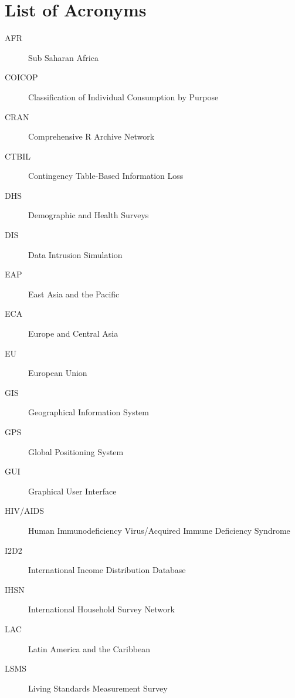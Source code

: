 \documentclass[letterpaper,10pt,english]{sphinxmanual}
\begin{document}
\section{List of Acronyms}
\label{\detokenize{glossary_acr:list-of-acronyms}}\begin{description}
\item[{AFR}] \leavevmode
Sub Saharan Africa

\item[{COICOP}] \leavevmode
Classification of Individual Consumption by Purpose

\item[{CRAN}] \leavevmode
Comprehensive R Archive Network

\item[{CTBIL}] \leavevmode
Contingency Table-Based Information Loss

\item[{DHS}] \leavevmode
Demographic and Health Surveys

\item[{DIS}] \leavevmode
Data Intrusion Simulation

\item[{EAP}] \leavevmode
East Asia and the Pacific

\item[{ECA}] \leavevmode
Europe and Central Asia

\item[{EU}] \leavevmode
European Union

\item[{GIS}] \leavevmode
Geographical Information System

\item[{GPS}] \leavevmode
Global Positioning System

\item[{GUI}] \leavevmode
Graphical User Interface

\item[{HIV/AIDS}] \leavevmode
Human Immunodeficiency Virus/Acquired Immune Deficiency Syndrome

\item[{I2D2}] \leavevmode
International Income Distribution Database

\item[{IHSN}] \leavevmode
International Household Survey Network

\item[{LAC}] \leavevmode
Latin America and the Caribbean

\item[{LSMS}] \leavevmode
Living Standards Measurement Survey


\end{description}
\end{document}
